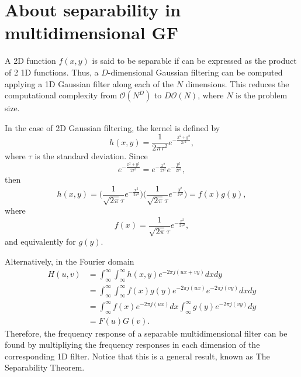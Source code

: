 \documentclass{article}
\begin{document}
\section{About separability in multidimensional GF}
\label{sec:GF_separability}

A 2D function $f(x,y)$ is said to be separable if can be expressed as
the product of 2 1D functions. Thus, a $D$-dimensional Gaussian
filtering can be computed applying a 1D Gaussian filter along each of
the $N$ dimensions. This reduces the computational complexity from
$\mathcal{O}(N^D)$ to $D\mathcal{O}(N)$, where $N$ is the problem
size.

In the case of 2D Gaussian filtering, the kernel is defined by
\begin{equation}
  h(x,y) = \frac{1}{2\pi\tau^2}e^{-\frac{x^2+y^2}{2\tau^2}},
  \label{eq:2DGF}
\end{equation}
where $\tau$ is the standard deviation. Since
\begin{equation*}
  e^{-\frac{x^2+y^2}{2\tau^2}} = e^{-\frac{x^2}{2\tau^2}}e^{-\frac{y^2}{2\tau^2}},
\end{equation*}
then
\begin{equation}
  h(x,y) = \Big(\frac{1}{\sqrt{2\pi}\tau}e^{-\frac{x^2}{2\tau^2}}\Big)\Big(\frac{1}{\sqrt{2\pi}\tau}e^{-\frac{y^2}{2\tau^2}}\Big) = f(x)g(y),
\end{equation}
where
\begin{equation}
  f(x) = \frac{1}{\sqrt{2\pi}\tau}e^{-\frac{x^2}{2\tau^2}},
\end{equation}
and equivalently for $g(y)$.

Alternatively, in the Fourier domain
\begin{equation*}
  \begin{split}
    H(u,v) & = \int_\infty^\infty\int_\infty^\infty h(x,y)e^{-2\pi j(ux+vy)}dxdy \\
           & = \int_\infty^\infty\int_\infty^\infty f(x)g(y)e^{-2\pi j(ux)}e^{-2\pi j(vy)}dxdy \\
           & = \int_\infty^\infty f(x)e^{-2\pi j(ux)} dx \int_\infty^\infty g(y) e^{-2\pi j(vy)} dy \\
           & = F(u)G(v).
  \end{split}
\end{equation*}
Therefore, the frequency response of a separable multidimensional
filter can be found by multipliying the frequency responses in each
dimension of the corresponding 1D filter. Notice that this is a
general result, known as The Separability Theorem.
\end{document}
